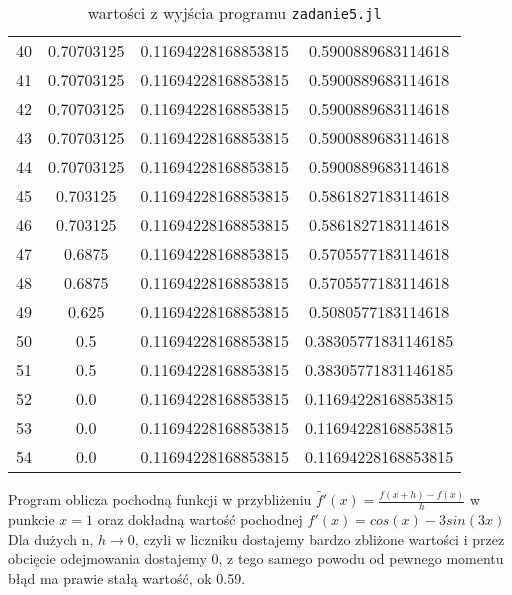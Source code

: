 \documentclass[11pt, a4paper]{article}
\begin{document}
  \begin{table}[ht]
    \centering
    \begin{tabular}{|c|c|c|c|}
      
      40 & 0.70703125 & 0.11694228168853815 & 0.5900889683114618 \\
      41 & 0.70703125 & 0.11694228168853815 & 0.5900889683114618 \\
      42 & 0.70703125 & 0.11694228168853815 & 0.5900889683114618 \\
      43 & 0.70703125 & 0.11694228168853815 & 0.5900889683114618 \\
      44 & 0.70703125 & 0.11694228168853815 & 0.5900889683114618 \\
      45 & 0.703125 & 0.11694228168853815 & 0.5861827183114618 \\
      46 & 0.703125 & 0.11694228168853815 & 0.5861827183114618 \\
      47 & 0.6875 & 0.11694228168853815 & 0.5705577183114618 \\
      48 & 0.6875 & 0.11694228168853815 & 0.5705577183114618 \\
      49 & 0.625 & 0.11694228168853815 & 0.5080577183114618 \\
      50 & 0.5 & 0.11694228168853815 & 0.38305771831146185 \\
      51 & 0.5 & 0.11694228168853815 & 0.38305771831146185 \\
      52 & 0.0 & 0.11694228168853815 & 0.11694228168853815 \\
      53 & 0.0 & 0.11694228168853815 & 0.11694228168853815 \\
      54 & 0.0 & 0.11694228168853815 & 0.11694228168853815 \\
      \hline
    \end{tabular}
    \caption{wartości z wyjścia programu \texttt{zadanie5.jl}}
  \end{table}

  Program oblicza pochodną funkcji w przybliżeniu $ \widetilde{f'}(x) = \frac{f(x + h) - f(x)}{h}$ w  punkcie $x=1$ oraz dokładną wartość pochodnej $f'(x) = cos(x) - 3sin(3x)$\\
  Dla dużych n, $h \rightarrow 0$, czyli w liczniku dostajemy bardzo zbliżone wartości i przez obcięcie odejmowania dostajemy 0, z tego samego powodu od pewnego momentu błąd ma prawie stałą wartość, ok 0.59.
\end{document}
